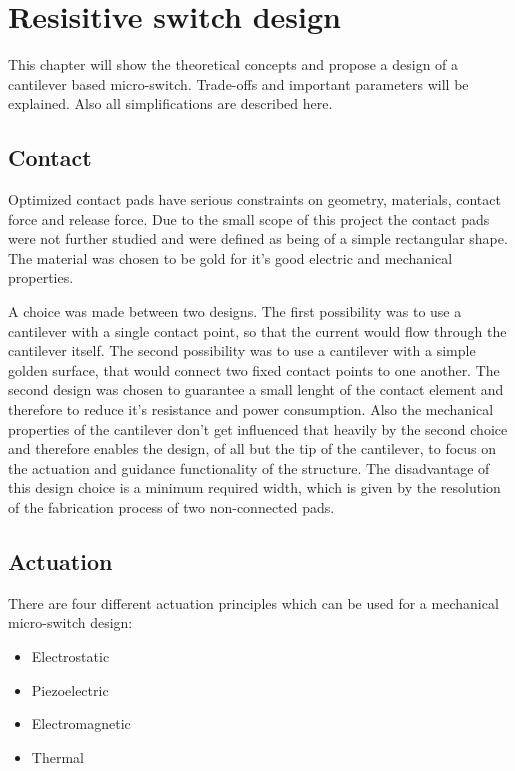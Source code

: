 \section{Resisitive switch design}
\label{sec:resisitive_switch_design}
This chapter will show the theoretical concepts and propose a design of a cantilever based micro-switch.
Trade-offs and important parameters will be explained.
Also all simplifications are described here.

\subsection{Contact}
\label{sec:contact}
Optimized contact pads have serious constraints on geometry, materials, contact force and release force. 
Due to the small scope of this project the contact pads were not further studied and were defined as being of a simple rectangular shape.
The material was chosen to be gold for it's good electric and mechanical properties. 

A choice was made between two designs.
The first possibility was to use a cantilever with a single contact point, so that the current would flow through the cantilever itself. %
The second possibility was to use a cantilever with a simple golden surface, that would connect two fixed contact points to one another. %
The second design was chosen to guarantee a small lenght of the contact element and therefore to reduce it's resistance and power consumption.
Also the mechanical properties of the cantilever don't get influenced that heavily by the second choice and therefore enables the design, of all but the tip of the cantilever, to focus on the actuation and guidance functionality of the structure.
The disadvantage of this design choice is a minimum required width, which is given by the resolution of the fabrication process of two non-connected pads.

\subsection{Actuation}
\label{sec:actuation}
There are four different actuation principles which can be used for a mechanical micro-switch design:
\begin{itemize}
  \item Electrostatic
  \item Piezoelectric
  \item Electromagnetic
  \item Thermal
\end{itemize}

